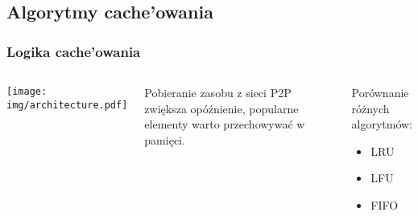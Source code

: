 \documentclass{beamer}
\begin{document}
\subsection{Algorytmy cache'owania}
\begin{frame}
\frametitle{Logika cache'owania}
\begin{columns}[c]

\begin{center}
\texttt{[image: img/architecture.pdf]}
\end{center}

\begin{block}{}
Pobieranie zasobu z sieci P2P zwiększa opóźnienie, 
popularne elementy warto przechowywać w pamięci.
\end{block}

\begin{block}{}
Porównanie różnych algorytmów:
\begin{itemize}
  \item LRU
  \item LFU
  \item FIFO
\end{itemize}
\end{block}

\end{columns}
\end{frame}

% 
% 
% 
\end{document}
